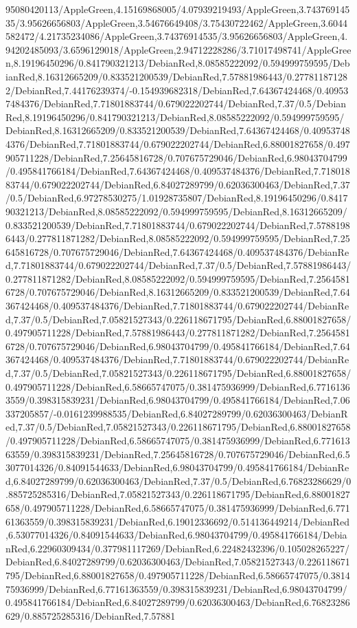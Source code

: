 {\begin{tikzternal}
{95080420113/AppleGreen,4.15169868005/4.07939219493/AppleGreen,3.74376914535/3.95626656803/AppleGreen,3.54676649408/3.75430722462/AppleGreen,3.6044582472/4.21735234086/AppleGreen,3.74376914535/3.95626656803/AppleGreen,4.94202485093/3.6596129018/AppleGreen,2.94712228286/3.71017498741/AppleGreen,8.19196450296/0.841790321213/DebianRed,8.08585222092/0.594999759595/DebianRed,8.16312665209/0.833521200539/DebianRed,7.57881986443/0.277811871282/DebianRed,7.44176239374/-0.154939682318/DebianRed,7.64367424468/0.409537484376/DebianRed,7.71801883744/0.679022202744/DebianRed,7.37/0.5/DebianRed,8.19196450296/0.841790321213/DebianRed,8.08585222092/0.594999759595/DebianRed,8.16312665209/0.833521200539/DebianRed,7.64367424468/0.409537484376/DebianRed,7.71801883744/0.679022202744/DebianRed,6.88001827658/0.497905711228/DebianRed,7.25645816728/0.707675729046/DebianRed,6.98043704799/0.495841766184/DebianRed,7.64367424468/0.409537484376/DebianRed,7.71801883744/0.679022202744/DebianRed,6.84027289799/0.62036300463/DebianRed,7.37/0.5/DebianRed,6.97278530275/1.01928735807/DebianRed,8.19196450296/0.841790321213/DebianRed,8.08585222092/0.594999759595/DebianRed,8.16312665209/0.833521200539/DebianRed,7.71801883744/0.679022202744/DebianRed,7.57881986443/0.277811871282/DebianRed,8.08585222092/0.594999759595/DebianRed,7.25645816728/0.707675729046/DebianRed,7.64367424468/0.409537484376/DebianRed,7.71801883744/0.679022202744/DebianRed,7.37/0.5/DebianRed,7.57881986443/0.277811871282/DebianRed,8.08585222092/0.594999759595/DebianRed,7.25645816728/0.707675729046/DebianRed,8.16312665209/0.833521200539/DebianRed,7.64367424468/0.409537484376/DebianRed,7.71801883744/0.679022202744/DebianRed,7.37/0.5/DebianRed,7.05821527343/0.226118671795/DebianRed,6.88001827658/0.497905711228/DebianRed,7.57881986443/0.277811871282/DebianRed,7.25645816728/0.707675729046/DebianRed,6.98043704799/0.495841766184/DebianRed,7.64367424468/0.409537484376/DebianRed,7.71801883744/0.679022202744/DebianRed,7.37/0.5/DebianRed,7.05821527343/0.226118671795/DebianRed,6.88001827658/0.497905711228/DebianRed,6.58665747075/0.381475936999/DebianRed,6.77161363559/0.398315839231/DebianRed,6.98043704799/0.495841766184/DebianRed,7.06337205857/-0.0161239988535/DebianRed,6.84027289799/0.62036300463/DebianRed,7.37/0.5/DebianRed,7.05821527343/0.226118671795/DebianRed,6.88001827658/0.497905711228/DebianRed,6.58665747075/0.381475936999/DebianRed,6.77161363559/0.398315839231/DebianRed,7.25645816728/0.707675729046/DebianRed,6.53077014326/0.84091544633/DebianRed,6.98043704799/0.495841766184/DebianRed,6.84027289799/0.62036300463/DebianRed,7.37/0.5/DebianRed,6.76823286629/0.885725285316/DebianRed,7.05821527343/0.226118671795/DebianRed,6.88001827658/0.497905711228/DebianRed,6.58665747075/0.381475936999/DebianRed,6.77161363559/0.398315839231/DebianRed,6.19012336692/0.514136449214/DebianRed,6.53077014326/0.84091544633/DebianRed,6.98043704799/0.495841766184/DebianRed,6.22960309434/0.377981117269/DebianRed,6.22482432396/0.105028265227/DebianRed,6.84027289799/0.62036300463/DebianRed,7.05821527343/0.226118671795/DebianRed,6.88001827658/0.497905711228/DebianRed,6.58665747075/0.381475936999/DebianRed,6.77161363559/0.398315839231/DebianRed,6.98043704799/0.495841766184/DebianRed,6.84027289799/0.62036300463/DebianRed,6.76823286629/0.885725285316/DebianRed,7.57881}
\end{tikzternal}}

